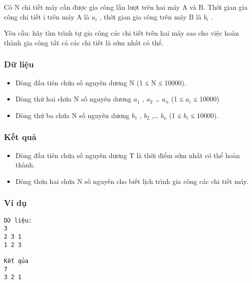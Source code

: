 



   Có N chi tiết máy cần được gia công lần lượt trên hai máy A và B. Thời gian gia công chi tiết i trên máy A là $a_{i}$   , thời gian gia công trên máy B là $b_{i}$   .  

   Yêu cầu: hãy tìm trình tự gia công các chi tiết trên hai máy sao cho việc hoàn thành gia công tất cả các chi tiết là sớm nhất có thể.  

\subsubsection{   Dữ liệu  }
\begin{itemize}
	\item     Dòng đầu tiên chứa số nguyên dương N (1 ≤ N ≤ 10000).   
	\item     Dòng thứ hai chứa N số nguyên dương $a_{1}$    , $a_{2}$    … $a_{n}$    (1 ≤ $a_{i}$    ≤ 10000)   
	\item     Dòng thứ ba chứa N số nguyên dương $b_{1}$    , $b_{2}$    ,… $b_{n}$    (1 ≤ $b_{i}$    ≤ 10000).   
\end{itemize}

\subsubsection{   Kết quả  }
\begin{itemize}
	\item     Dòng đầu tiên chứa số nguyên dương T là thời điểm sớm nhất có thể hoàn thành.   
	\item     Dòng thứa hai chứa N số nguyên cho biết lịch trình gia công các chi tiết máy.   
\end{itemize}

\subsubsection{   Ví dụ  }
\begin{verbatim}
Dữ liệu:
3
2 3 1
1 2 3

Kết qủa
7
3 2 1
\end{verbatim}
